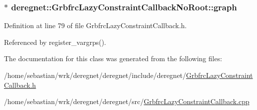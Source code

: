 \subsubsection[{\texorpdfstring{graph}{graph}}]{$\ast$ deregnet\+::\+Grbfrc\+Lazy\+Constraint\+Callback\+No\+Root\+::graph\hspace{0.3cm}{\ttfamily [private]}}\hypertarget{classderegnet_1_1GrbfrcLazyConstraintCallbackNoRoot_a0c5b7bfa966879cc74fea0ea1c5c864c}{}\label{classderegnet_1_1GrbfrcLazyConstraintCallbackNoRoot_a0c5b7bfa966879cc74fea0ea1c5c864c}


Definition at line 79 of file Grbfrc\+Lazy\+Constraint\+Callback.\+h.



Referenced by register\+\_\+vargrps().



The documentation for this class was generated from the following files\+:\begin{DoxyCompactItemize}
\item 
/home/sebastian/wrk/deregnet/deregnet/include/deregnet/\hyperlink{GrbfrcLazyConstraintCallback_8h}{Grbfrc\+Lazy\+Constraint\+Callback.\+h}\item 
/home/sebastian/wrk/deregnet/deregnet/src/\hyperlink{GrbfrcLazyConstraintCallback_8cpp}{Grbfrc\+Lazy\+Constraint\+Callback.\+cpp}\end{DoxyCompactItemize}
